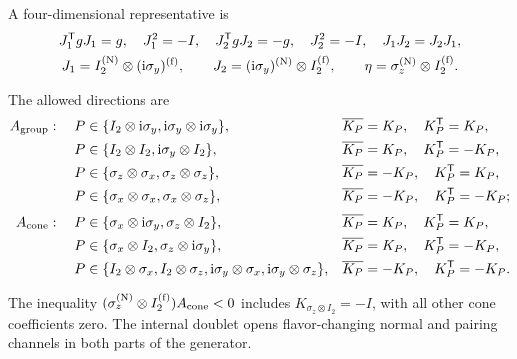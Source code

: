 A four-dimensional representative is
\begin{equation}
\begin{gathered}
J_1^{\mathsf{T}} gJ_1=g,\quad J_1^2=-I,\quad
J_2^{\mathsf{T}} gJ_2=-g,\quad J_2^2=-I,\quad
J_1J_2=J_2J_1,\\
J_1=I_2^{({\rm N})}\otimes(\mathrm{i}\sigma_y)^{({\rm f})},\qquad
J_2=(\mathrm{i}\sigma_y)^{({\rm N})}\otimes I_2^{({\rm f})},\qquad
\eta=\sigma_z^{({\rm N})}\otimes I_2^{({\rm f})}.
\end{gathered}
\end{equation}
\begin{samepage}
The allowed directions are
\begin{align*}
A_{\rm group}:\quad
P&\in\{I_2\otimes\mathrm{i}\sigma_y,\mathrm{i}\sigma_y\otimes\mathrm{i}\sigma_y\},
&&\overline{K_P}=K_P,\quad K_P^{\mathsf{T}}=K_P,\\
P&\in\{I_2\otimes I_2,\mathrm{i}\sigma_y\otimes I_2\},
&&\overline{K_P}=K_P,\quad K_P^{\mathsf{T}}=-K_P,\\
P&\in\{\sigma_z\otimes\sigma_x,\sigma_z\otimes\sigma_z\},
&&\overline{K_P}=-K_P,\quad K_P^{\mathsf{T}}=K_P,\\
P&\in\{\sigma_x\otimes\sigma_x,\sigma_x\otimes\sigma_z\},
&&\overline{K_P}=-K_P,\quad K_P^{\mathsf{T}}=-K_P;\\[2pt]
A_{\rm cone}:\quad
P&\in\{\sigma_x\otimes\mathrm{i}\sigma_y,\sigma_z\otimes I_2\},
&&\overline{K_P}=K_P,\quad K_P^{\mathsf{T}}=K_P,\\
P&\in\{\sigma_x\otimes I_2,\sigma_z\otimes\mathrm{i}\sigma_y\},
&&\overline{K_P}=K_P,\quad K_P^{\mathsf{T}}=-K_P,\\
P&\in\{I_2\otimes\sigma_x,I_2\otimes\sigma_z,
\mathrm{i}\sigma_y\otimes\sigma_x,\mathrm{i}\sigma_y\otimes\sigma_z\},
&&\overline{K_P}=-K_P,\quad K_P^{\mathsf{T}}=-K_P.
\end{align*}
\end{samepage}
The inequality \((\sigma_z^{({\rm N})}\otimes I_2^{({\rm f})})A_{\rm cone}<0\) includes
\(K_{\sigma_z\otimes I_2}=-I\), with all other cone coefficients zero.  The internal doublet opens flavor-changing normal and pairing channels in both parts of the generator.

